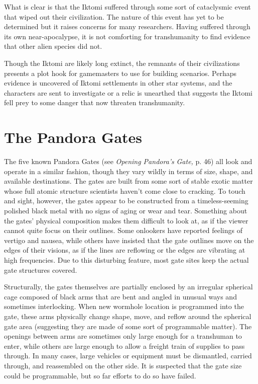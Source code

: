 What is clear is that the Iktomi suffered through 
some sort of cataclysmic event that wiped out their 
civilization. The nature of this event has yet to be determined
but it raises concerns for many researchers.
Having suffered through its own near-apocalypse, it 
is not comforting for transhumanity to find evidence 
that other alien species did not.

Though the Iktomi are likely long extinct, the remnants
of their civilizations presents a plot hook for
gamemasters to use for building scenarios. Perhaps 
evidence is uncovered of Iktomi settlements in other 
star systems, and the characters are sent to investigate 
or a relic is unearthed that suggests the Iktomi fell 
prey to some danger that now threaten transhumanity. 

\section{The Pandora Gates}

The five known Pandora Gates (see \textit{Opening Pandora's }
\textit{Gate,} p. 46) all look and operate in a similar fashion, 
though they vary wildly in terms of size, shape, and 
available destinations. The gates are built from some 
sort of stable exotic matter whose full atomic structure
scientists haven't come close to cracking. To touch
and sight, however, the gates appear to be constructed 
from a timeless-seeming polished black metal with no 
signs of aging or wear and tear. Something about the 
gates' physical composition makes them difficult to 
look at, as if the viewer cannot quite focus on their 
outlines. Some onlookers have reported feelings of 
vertigo and nausea, while others have insisted that the 
gate outlines move on the edges of their visions, as if 
the lines are reflowing or the edges are vibrating at 
high frequencies. Due to this disturbing feature, most 
gate sites keep the actual gate structures covered.

Structurally, the gates themselves are partially 
enclosed by an irregular spherical cage composed of 
black arms that are bent and angled in unusual ways 
and sometimes interlocking. When new wormhole 
location is programmed into the gate, these arms 
physically change shape, move, and reflow  around 
the spherical gate area (suggesting they are made of 
some sort of programmable matter). The openings 
between arms are sometimes only large enough for 
a transhuman to enter, while others are large enough 
to allow a freight train of supplies to pass through. 
In many cases, large vehicles or equipment must be 
dismantled, carried through, and reassembled on the 
other side. It is suspected that the gate size could be 
programmable, but so far efforts to do so have failed.

